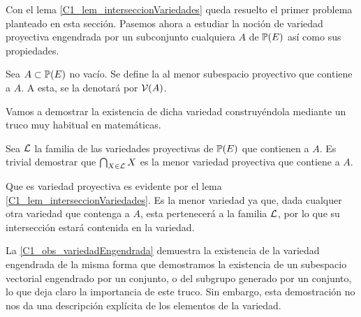 Con el lema \ref{C1_lem_interseccionVariedades} queda resuelto el primer problema planteado en esta sección. Pasemos ahora a estudiar la noción de variedad proyectiva engendrada por un subconjunto cualquiera $A$ de $\mathbb{P}(E)$ así como sus propiedades.
\begin{defi}
	\label{C1_def_variedadEngendrada}
	Sea $A\subset\mathbb{P}(E)$ no vacío. Se define la  al menor subespacio proyectivo que contiene a $A$. A esta, se la denotará por $\mathcal{V}(A)$.
\end{defi}
Vamos a demostrar la existencia de dicha variedad construyéndola mediante un truco muy habitual en matemáticas.
\begin{obs}
	\label{C1_obs_variedadEngendrada}
	Sea $\mathcal{L}$ la familia de las variedades proyectivas de $\mathbb{P}(E)$ que contienen a $A$. Es trivial demostrar que $\bigcap_{X\in\mathcal{L}}X$ es la menor variedad proyectiva que contiene a $A$.
	
	Que es variedad proyectiva es evidente por el lema \ref{C1_lem_interseccionVariedades}. Es la menor variedad ya que, dada cualquer otra variedad que contenga a $A$, esta pertenecerá a la familia $\mathcal{L}$, por lo que su intersección estará contenida en la variedad.
\end{obs}
La \ref{C1_obs_variedadEngendrada} demuestra la existencia de la variedad engendrada de la misma forma que demostramos la existencia de un subespacio vectorial engendrado por un conjunto, o del subgrupo generado por un conjunto, lo que deja claro la importancia de este truco. Sin embargo, esta demostración no nos da una descripción explícita de los elementos de la variedad.

